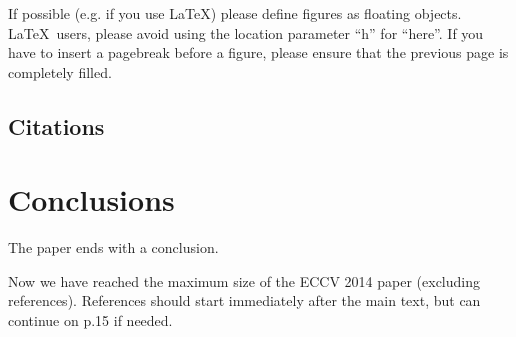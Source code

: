 \documentclass[runningheads]{llncs}
\begin{document}
If possible (e.g. if you use \LaTeX) please define figures as floating
objects. \LaTeX\ users, please avoid using the location
parameter ``h'' for ``here''. If you have to insert a pagebreak before a
figure, please ensure that the previous page is completely filled.





\subsection{Citations}

\section{Conclusions}

The paper ends with a conclusion. 

\par\vfill\par
Now we have reached the maximum size of the ECCV 2014 paper (excluding references).
References should start immediately after the main text, but can continue on p.15 if needed.

\clearpage



\end{document}
